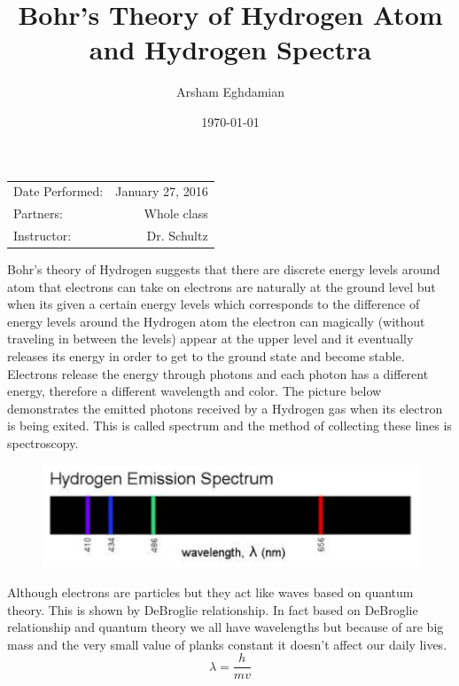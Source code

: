 \documentclass{article}
\title{Bohr's Theory of Hydrogen Atom and Hydrogen Spectra}
\author{Arsham Eghdamian } %
\date{\today} %
\begin{document}
\maketitle %

\begin{center}
\begin{tabular}{l r}
Date Performed: & January 27, 2016 \\ %
Partners: & Whole class \\ %
Instructor: & Dr. Schultz %
\end{tabular}
\end{center}


\maketitle

Bohr’s theory of Hydrogen suggests that there are discrete energy levels around atom that electrons can take on electrons are naturally at the ground level but when its given a certain energy levels which corresponds to the difference of energy levels around the Hydrogen atom the electron can magically (without traveling in between the levels) appear at the upper level and it eventually releases its energy in order to get to the ground state and become stable. Electrons release the energy through photons and each photon has a different energy, therefore a different wavelength and color. The picture below demonstrates the emitted photons received by a Hydrogen gas when its electron is being exited. This is called spectrum and the method of collecting these lines is spectroscopy. 
\begin{figure}[h!]
    \centering
    \includegraphics[scale=0.7]{HE.png}
    
\end{figure}
Although electrons are particles but they act like waves based on quantum theory. This is shown by DeBroglie relationship. In fact based on DeBroglie relationship and quantum theory we all have wavelengths but because of are big mass and the very small value of planks constant it doesn’t affect our daily lives. 
\begin{equation}
    \lambda = \frac{h}{mv}
\end{equation}
	
\end{document}
